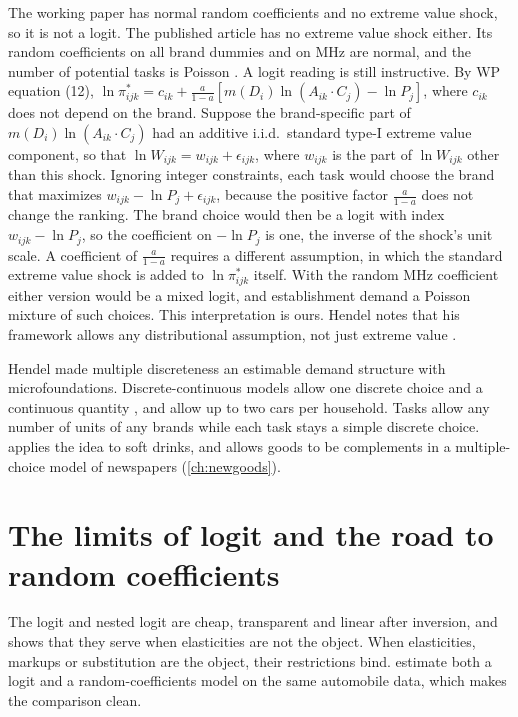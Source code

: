 The working paper has normal random coefficients and no extreme value shock, so it is not a logit. The published
article has no extreme value shock either. Its random coefficients on all brand dummies and on MHz are normal, and
the number of potential tasks is Poisson \citep[p.~437]{Hendel1999}. A logit reading is still instructive. By WP equation (12), $\ln\pi^*_{ijk} = c_{ik} + \frac{a}{1-a}[m(D_i)\ln(A_{ik}\cdot C_j) - \ln
P_j]$, where $c_{ik}$ does not depend on the brand. Suppose the brand-specific part of $m(D_i)\ln(A_{ik}\cdot C_j)$ had an
additive i.i.d.\ standard type-I extreme value component, so that $\ln W_{ijk} = w_{ijk} + \epsilon_{ijk}$, where $w_{ijk}$ is the part of $\ln W_{ijk}$ other than this shock. Ignoring
integer constraints, each task would choose the brand that maximizes $w_{ijk} - \ln P_j + \epsilon_{ijk}$, because the
positive factor $\frac{a}{1-a}$ does not change the ranking. The brand choice would then be a logit with index
$w_{ijk} - \ln P_j$, so the coefficient on $-\ln P_j$ is one, the inverse of the shock's unit scale. A coefficient of
$\frac{a}{1-a}$ requires a different assumption, in which the standard extreme value shock is added to
$\ln\pi^*_{ijk}$ itself. With the random MHz coefficient either version would
be a mixed logit, and establishment demand a Poisson mixture of such choices. This interpretation is ours. Hendel
notes that his framework allows any distributional assumption, not just extreme value
\citep[pp.~424--425]{Hendel1999}.

Hendel made multiple discreteness an estimable demand structure with microfoundations. Discrete-continuous models
allow one discrete choice and a continuous quantity \citep{DubinMcFadden1984,Hanemann1984}, and
\citet{ManskiSherman1980} allow up to two cars per household. Tasks allow any number of units of any brands while
each task stays a simple discrete choice. \citet{Dube2004} applies the idea to soft drinks, and
\citet{Gentzkow2007} allows goods to be complements in a multiple-choice model of newspapers (\cref{ch:newgoods}).

\section{The limits of logit and the road to random coefficients}\label{sec:07-limits}

The logit and nested logit are cheap, transparent and linear after inversion, and \citet{Einav2007} shows that they
serve when elasticities are not the object. When elasticities, markups or substitution are the object, their
restrictions bind. \citet{BerryLevinsohnPakes1995} estimate both a logit and a random-coefficients model on the
same automobile data, which makes the comparison clean.

